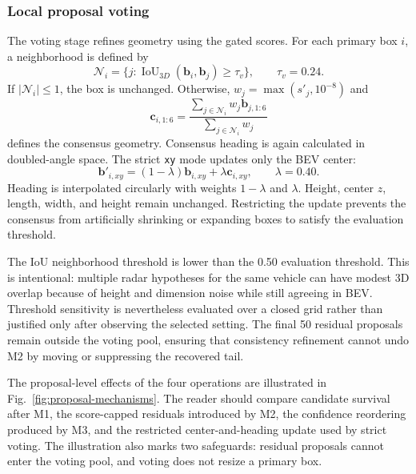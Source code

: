 \documentclass[preprint,12pt,times]{elsarticle}
\newcommand{\figref}[1]{\textcolor{floatreviewblue}{Fig.~\ref{#1}}}
\newcommand{\figref}[1]{Fig.~\ref{#1}}
\begin{document}
\subsubsection{Local proposal voting}

The voting stage refines geometry using the gated scores. For each primary box
$i$, a neighborhood is defined by
\begin{equation}
\mathcal{N}_i=\{j:
\operatorname{IoU}_{3D}(\mathbf{b}_i,\mathbf{b}_j)\geq\tau_v\},
\qquad \tau_v=0.24.
\end{equation}
If $\lvert\mathcal{N}_i\rvert\leq1$, the box is unchanged. Otherwise,
$w_j=\max(s'_j,10^{-8})$ and
\begin{equation}
\mathbf{c}_{i,1:6}=
\frac{\sum_{j\in\mathcal{N}_i}w_j\mathbf{b}_{j,1:6}}
{\sum_{j\in\mathcal{N}_i}w_j}
\end{equation}
defines the consensus geometry. Consensus heading is again calculated in
doubled-angle space. The strict \texttt{xy} mode updates only the BEV center:
\begin{equation}
\mathbf{b}'_{i,xy}=(1-\lambda)\mathbf{b}_{i,xy}
+\lambda\mathbf{c}_{i,xy},
\qquad \lambda=0.40.
\label{eq:voting}
\end{equation}
Heading is interpolated circularly with weights $1-\lambda$ and $\lambda$.
Height, center $z$, length, width, and height remain unchanged. Restricting the
update prevents the consensus from artificially shrinking or expanding boxes
to satisfy the evaluation threshold.

The IoU neighborhood threshold is lower than the 0.50 evaluation threshold.
This is intentional: multiple radar hypotheses for the same vehicle can have
modest 3D overlap because of height and dimension noise while still agreeing
in BEV. Threshold sensitivity is nevertheless evaluated over a closed grid
rather than justified only after observing the selected setting. The final 50
residual proposals remain outside the voting pool, ensuring that consistency
refinement cannot undo M2 by moving or suppressing the recovered tail.

The proposal-level effects of the four operations are illustrated in
\figref{fig:proposal-mechanisms}. The reader should compare candidate survival
after M1, the score-capped residuals introduced by M2, the confidence
reordering produced by M3, and the restricted center-and-heading update used
by strict voting. The illustration also marks two safeguards: residual
proposals cannot enter the voting pool, and voting does not resize a primary
box.
\end{document}
